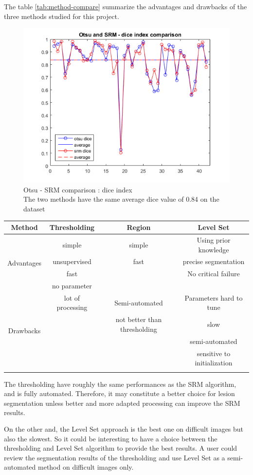 \documentclass[a4paper,10pt]{article}
\begin{document}
The table \ref{tab:method-compare} summarize the advantages and drawbacks of the three methods studied for this project.

\begin{figure}[h]
\centering
\includegraphics[width=0.7\linewidth]{../results/comparison/otsu-srm-compare}
\caption{Otsu - SRM comparison : dice index\\ The two methods have the same average dice value of 0.84 on the dataset}
\label{fig:otsu-srm-compare}
\end{figure}

\begin{tabular}{|c|c|c|c|}
	\hline
	 Method & Thresholding & Region & Level Set \\ \hline 
	\multirow{4}{*}{ Advantages} & simple & simple & Using prior knowledge \\ 
	& unsupervised & fast & precise segmentation \\
	& fast & & No critical failure\\
	& no parameter & & \\ \hline 
	\multirow{4}{*}{Drawbacks} & lot of processing & Semi-automated & Parameters hard to tune \\ 
	& & not better than thresholding & slow \\
	& & & semi-automated \\
	& & & sensitive to initialization \\ \hline 
	\label{tab:method-compare}
\end{tabular} 

The thresholding have roughly the same performances as the SRM algorithm, and is fully automated. Therefore, it may constitute a better choice for lesion segmentation unless better and more adapted processing can improve the SRM results.

On the other and, the Level Set approach is the best one on difficult images but also the slowest. So it could be interesting to have a choice between the thresholding and Level Set algorithm to provide the best results. A user could review the segmentation results of the thresholding and use Level Set as a semi-automated method on difficult images only.
\end{document}
